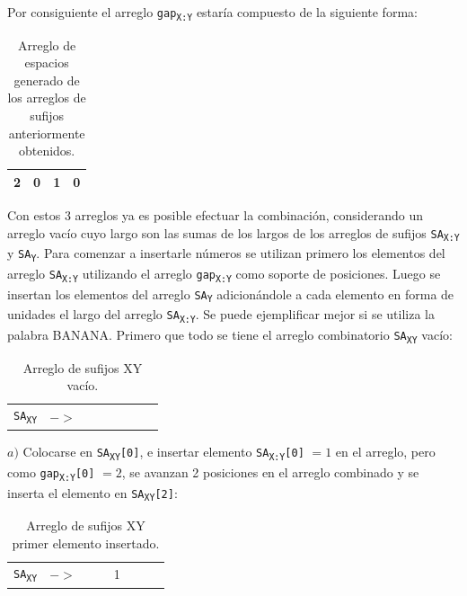 Por consiguiente el arreglo \texttt{gap\textsubscript{X:Y}} estaría compuesto de la siguiente forma:

\begin{table}[!hbt]
\centering
\begin{tabular}{|l|l|l|l|}
\hline
2 & 0 & 1 & 0 \\ \hline
\end{tabular}
\caption{Arreglo de espacios generado de los arreglos de sufijos anteriormente obtenidos.}
\end{table} 

Con estos 3 arreglos ya es posible efectuar la combinación, considerando un arreglo vacío cuyo largo son las sumas de los largos de los arreglos de sufijos \texttt{SA\textsubscript{X:Y}} y \texttt{SA\textsubscript{Y}}. Para comenzar a insertarle números se utilizan primero los elementos del arreglo \texttt{SA\textsubscript{X:Y}} utilizando el arreglo \texttt{gap\textsubscript{X:Y}} como soporte de posiciones. Luego se insertan los elementos del arreglo \texttt{SA\textsubscript{Y}} adicionándole a cada elemento en forma de unidades el largo del arreglo \texttt{SA\textsubscript{X:Y}}. Se puede ejemplificar mejor si se utiliza la palabra BANANA. Primero que todo se tiene el arreglo combinatorio \texttt{SA\textsubscript{XY}} vacío:

\begin{table}[!hbt]
\centering
\begin{tabular}{cc|c|c|c|c|c|c|}
\cline{3-8}
\texttt{SA\textsubscript{XY}} &  $->$ &  &  &  &  &  &  \\ \cline{3-8} 
\end{tabular}
\caption{Arreglo de sufijos XY vacío.}
\end{table}

\newpage

$a)$ Colocarse en \texttt{SA\textsubscript{XY}[0]}, e insertar elemento \texttt{SA\textsubscript{X:Y}[0]} $= 1$ en el arreglo, pero como \texttt{gap\textsubscript{X:Y}[0]} $= 2$, se avanzan 2 posiciones en el arreglo combinado y se inserta el elemento en \texttt{SA\textsubscript{XY}[2]}:

\begin{table}[!hbt]
\centering
\begin{tabular}{cc|c|c|c|c|c|c|}
\cline{3-8}
\texttt{SA\textsubscript{XY}} &  $->$ &  &  & 1 &  &  &  \\ \cline{3-8} 
\end{tabular}
\caption{Arreglo de sufijos XY primer elemento insertado.}
\end{table}

